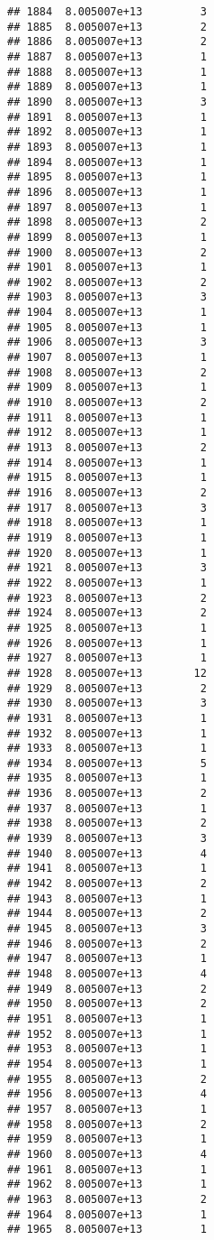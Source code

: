 \documentclass[
]{article}
\begin{document}
\begin{verbatim}
## 1884  8.005007e+13         3
## 1885  8.005007e+13         2
## 1886  8.005007e+13         2
## 1887  8.005007e+13         1
## 1888  8.005007e+13         1
## 1889  8.005007e+13         1
## 1890  8.005007e+13         3
## 1891  8.005007e+13         1
## 1892  8.005007e+13         1
## 1893  8.005007e+13         1
## 1894  8.005007e+13         1
## 1895  8.005007e+13         1
## 1896  8.005007e+13         1
## 1897  8.005007e+13         1
## 1898  8.005007e+13         2
## 1899  8.005007e+13         1
## 1900  8.005007e+13         2
## 1901  8.005007e+13         1
## 1902  8.005007e+13         2
## 1903  8.005007e+13         3
## 1904  8.005007e+13         1
## 1905  8.005007e+13         1
## 1906  8.005007e+13         3
## 1907  8.005007e+13         1
## 1908  8.005007e+13         2
## 1909  8.005007e+13         1
## 1910  8.005007e+13         2
## 1911  8.005007e+13         1
## 1912  8.005007e+13         1
## 1913  8.005007e+13         2
## 1914  8.005007e+13         1
## 1915  8.005007e+13         1
## 1916  8.005007e+13         2
## 1917  8.005007e+13         3
## 1918  8.005007e+13         1
## 1919  8.005007e+13         1
## 1920  8.005007e+13         1
## 1921  8.005007e+13         3
## 1922  8.005007e+13         1
## 1923  8.005007e+13         2
## 1924  8.005007e+13         2
## 1925  8.005007e+13         1
## 1926  8.005007e+13         1
## 1927  8.005007e+13         1
## 1928  8.005007e+13        12
## 1929  8.005007e+13         2
## 1930  8.005007e+13         3
## 1931  8.005007e+13         1
## 1932  8.005007e+13         1
## 1933  8.005007e+13         1
## 1934  8.005007e+13         5
## 1935  8.005007e+13         1
## 1936  8.005007e+13         2
## 1937  8.005007e+13         1
## 1938  8.005007e+13         2
## 1939  8.005007e+13         3
## 1940  8.005007e+13         4
## 1941  8.005007e+13         1
## 1942  8.005007e+13         2
## 1943  8.005007e+13         1
## 1944  8.005007e+13         2
## 1945  8.005007e+13         3
## 1946  8.005007e+13         2
## 1947  8.005007e+13         1
## 1948  8.005007e+13         4
## 1949  8.005007e+13         2
## 1950  8.005007e+13         2
## 1951  8.005007e+13         1
## 1952  8.005007e+13         1
## 1953  8.005007e+13         1
## 1954  8.005007e+13         1
## 1955  8.005007e+13         2
## 1956  8.005007e+13         4
## 1957  8.005007e+13         1
## 1958  8.005007e+13         2
## 1959  8.005007e+13         1
## 1960  8.005007e+13         4
## 1961  8.005007e+13         1
## 1962  8.005007e+13         1
## 1963  8.005007e+13         2
## 1964  8.005007e+13         1
## 1965  8.005007e+13         1

\end{verbatim}
\end{document}
